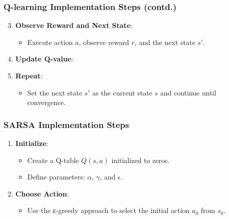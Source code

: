 \documentclass{beamer}
\begin{document}
\begin{frame}
    \frametitle{Q-learning Implementation Steps (contd.)}
    \begin{enumerate}
        \setcounter{enumi}{2}
        \item \textbf{Observe Reward and Next State}:
            \begin{itemize}
                \item Execute action \( a \), observe reward \( r \), and the next state \( s' \).
            \end{itemize}
        \item \textbf{Update Q-value}:
        \item \textbf{Repeat}:
            \begin{itemize}
                \item Set the next state \( s' \) as the current state \( s \) and continue until convergence.
            \end{itemize}
    \end{enumerate}
\end{frame}

\begin{frame}[fragile]
    \frametitle{SARSA Implementation Steps}
    \begin{enumerate}
        \item \textbf{Initialize}:
            \begin{itemize}
                \item Create a Q-table \( Q(s, a) \) initialized to zeros.
                \item Define parameters: \( \alpha \), \( \gamma \), and \( \epsilon \).
            \end{itemize}
        \item \textbf{Choose Action}:
            \begin{itemize}
                \item Use the ε-greedy approach to select the initial action \( a_0 \) from \( s_0 \).
            \end{itemize}
    \end{enumerate}
\end{frame}
\end{document}

